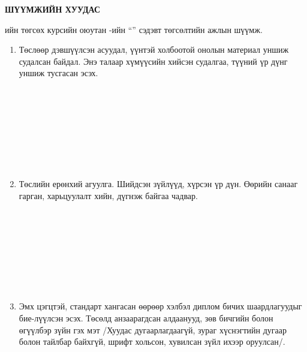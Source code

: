 \begin{titlepage}
\begin{center}

{\scshape\Large \univname\par} %
{\scshape\large \facname\par}\vspace{1cm} %

\textbf{{\Large ШҮҮМЖИЙН ХУУДАС}}\\[1cm]

\end{center}

\normalsize

\deptname{}ийн төгсөх курсийн оюутан \shortname{}-ийн ``\ttitle'' сэдэвт төгсөлтийн ажлын шүүмж.

\begin{enumerate}
\item Төслөөр дэвшүүлсэн асуудал, үүнтэй холбоотой онолын материал уншиж судалсан байдал. Энэ талаар хүмүүсийн хийсэн судалгаа, түүний үр дүнг уншиж тусгасан эсэх.
\begin{center}
\dotfill \\[0.1cm]
\dotfill \\[0.1cm]
\dotfill \\[0.1cm]
\dotfill \\[0.1cm]
\dotfill \\[0.1cm]
\dotfill \\[0.1cm]
\dotfill \\[0.4cm]
\end{center}
\item Төслийн ерөнхий агуулга. Шийдсэн зүйлүүд, хүрсэн үр дүн. Өөрийн санааг гарган, харьцуулалт хийн, дүгнэж байгаа чадвар.
\begin{center}
\dotfill \\[0.1cm]
\dotfill \\[0.1cm]
\dotfill \\[0.1cm]
\dotfill \\[0.1cm]
\dotfill \\[0.1cm]
\dotfill \\[0.1cm]
\dotfill \\[0.4cm]
\end{center}
\item Эмх цэгцтэй, стандарт хангасан өөрөөр хэлбэл диплом бичих шаардлагуудыг бие-лүүлсэн эсэх. Төсөлд анзаарагдсан алдаанууд, зөв бичгийн болон өгүүлбэр зүйн гэх мэт /Хуудас дугаарлагдаагүй, зураг хүснэгтийн дугаар болон тайлбар байхгүй, шрифт хольсон, хувилсан зүйл ихээр оруулсан/.

\end{enumerate}
\end{titlepage}
